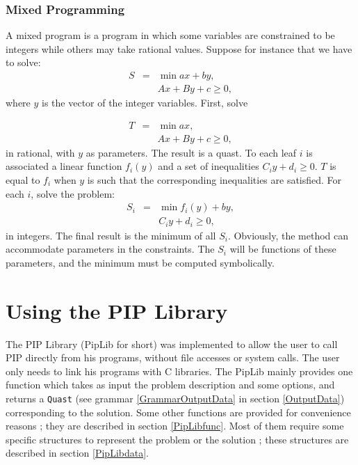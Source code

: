\documentclass[12pt,a4paper,dvips]{article}
\begin{document}
\subsubsection{Mixed Programming}

A mixed program is a program in which some variables are constrained
to be integers while others may take rational values. Suppose for
instance that we have to solve:
\begin{eqnarray*}
S & = & \min a x + b y,\\
  &   & A x + B y + c \ge 0,
\end{eqnarray*}
where $y$ is the vector of the integer variables. First, solve

\begin{eqnarray*}
T & = & \min a x,\\
  &   & A x + B y + c \ge 0,
\end{eqnarray*}
in rational, with $y$ as parameters. The result is a quast.
To each leaf $i$ is associated a linear function $f_i(y)$
and a set of inequalities $C_i y + d_i \ge 0$. $T$ is equal to
$f_i$ when $y$ is such that the corresponding inequalities
are satisfied. For each $i$, solve the problem:
\begin{eqnarray*}
S_i & = & \min f_i(y) + b y,\\
  &   & C_i y + d_i \ge 0,
\end{eqnarray*}
in integers. The final result is the minimum of all $S_i$.
Obviously, the method can accommodate parameters in the
constraints. The $S_i$ will be functions of these
parameters, and the minimum must be computed symbolically.

%
%
\section{Using the PIP Library}
The PIP Library (PipLib for short) was implemented to allow the user to call PIP
directly from his programs, without file accesses or system calls. The
user only needs to link his programs with C libraries. The
PipLib mainly provides one function which takes as input the problem description
and some options, and returns a {\tt Quast} (see grammar \ref{GrammarOutputData}
in section \ref{OutputData}) corresponding to the solution. Some
other functions are provided for convenience reasons ; they
are described in section \ref{PipLibfunc}. Most of them require
some specific structures to represent the problem or
the solution ; these structures are described in section \ref{PipLibdata}.
\end{document}
